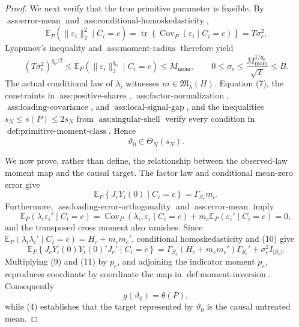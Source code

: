 \documentclass{article}
\begin{document}
\begin{proof}
We next verify that the true primitive parameter is feasible.  By \(\operatorname{ass:error\text{-}mean}\) and \(\operatorname{ass:conditional\text{-}homoskedasticity}\),
\[
 \mathbb E_P\!\left(\|\varepsilon_i\|_2^2\mid C_i=c\right)
 =\operatorname{tr}\!\left\{\operatorname{Cov}_P(\varepsilon_i\mid C_i=c)\right\}
 =T\sigma_c^2.
\]
Lyapunov's inequality and \(\operatorname{ass:moment\text{-}radius}\) therefore yield
\[
 (T\sigma_c^2)^{q_0/2}
 \leq\mathbb E_P\!\left(\|\varepsilon_i\|_2^{q_0}\mid C_i=c\right)
 \leq M_{\mathrm{mom}},
 \qquad
 0\leq\sigma_c\leq \frac{M_{\mathrm{mom}}^{1/q_0}}{\sqrt T}\leq B.
 \tag{7}
\]
The actual conditional law of \(\lambda_i\) witnesses \(m\in\mathfrak M_\lambda(H)\).  Equation (7), the constraints in \(\operatorname{ass:positive\text{-}shares}\), \(\operatorname{ass:factor\text{-}normalization}\), \(\operatorname{ass:loading\text{-}covariance}\), and \(\operatorname{ass:local\text{-}signal\text{-}gap}\), and the inequalities \(s_N\leq s(P)\leq2s_N\) from \(\operatorname{ass:singular\text{-}shell}\) verify every condition in \(\operatorname{def:primitive\text{-}moment\text{-}class}\).  Hence
\[
 \vartheta_0\in\overline\Theta_N(s_N).
 \tag{8}
\]

We now prove, rather than define, the relationship between the observed-law moment map and the causal target.  The factor law and conditional mean-zero error give
\[
 \mathbb E_P\!\left\{J_cY_i(0)\mid C_i=c\right\}=\Gamma_{S_c}m_c.
 \tag{9}
\]
Furthermore, \(\operatorname{ass:loading\text{-}error\text{-}orthogonality}\) and \(\operatorname{ass:error\text{-}mean}\) imply
\[
 \mathbb E_P\!\left(\lambda_i\varepsilon_i'\mid C_i=c\right)
 =\operatorname{Cov}_P(\lambda_i,\varepsilon_i\mid C_i=c)
 +m_c\mathbb E_P\!\left(\varepsilon_i'\mid C_i=c\right)
 =0,
 \tag{10}
\]
and the transposed cross moment also vanishes.  Since
\(\mathbb E_P(\lambda_i\lambda_i'\mid C_i=c)=H_c+m_cm_c'\), conditional homoskedasticity and (10) give
\[
 \mathbb E_P\!\left\{J_cY_i(0)Y_i(0)'J_c'\mid C_i=c\right\}
 =\Gamma_{S_c}(H_c+m_cm_c')\Gamma_{S_c}'
 +\sigma_c^2I_{|S_c|}.
 \tag{11}
\]
Multiplying (9) and (11) by \(p_c\), and adjoining the indicator moment \(p_c\), reproduces coordinate by coordinate the map in \(\operatorname{def:moment\text{-}inversion}\).  Consequently
\[
 g(\vartheta_0)=\theta(P),
 \tag{12}
\]
while (4) establishes that the target represented by \(\vartheta_0\) is the causal untreated mean.


\end{proof}
\end{document}
